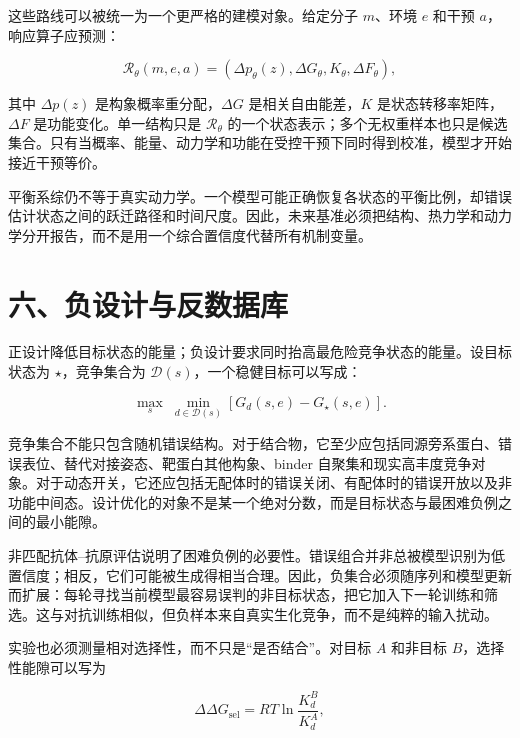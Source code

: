 \documentclass[10pt]{article}
\begin{document}
这些路线可以被统一为一个更严格的建模对象。给定分子 $m$、环境 $e$ 和干预 $a$，响应算子应预测：

\begin{equation}
\mathcal R_\theta(m,e,a)
=
\left(
\Delta p_\theta(z),
\Delta G_\theta,
K_\theta,
\Delta F_\theta
\right),
\label{eq:response}
\end{equation}

其中 $\Delta p(z)$ 是构象概率重分配，$\Delta G$ 是相关自由能差，$K$ 是状态转移率矩阵，$\Delta F$ 是功能变化。单一结构只是 $\mathcal R_\theta$ 的一个状态表示；多个无权重样本也只是候选集合。只有当概率、能量、动力学和功能在受控干预下同时得到校准，模型才开始接近干预等价。

平衡系综仍不等于真实动力学。一个模型可能正确恢复各状态的平衡比例，却错误估计状态之间的跃迁路径和时间尺度。因此，未来基准必须把结构、热力学和动力学分开报告，而不是用一个综合置信度代替所有机制变量。

\section*{六、负设计与反数据库}

正设计降低目标状态的能量；负设计要求同时抬高最危险竞争状态的能量。设目标状态为 $\star$，竞争集合为 $\mathcal D(s)$，一个稳健目标可以写成：

\begin{equation}
\max_s\;
\min_{d\in\mathcal D(s)}
\left[G_d(s,e)-G_\star(s,e)\right].
\label{eq:negative_design}
\end{equation}

竞争集合不能只包含随机错误结构。对于结合物，它至少应包括同源旁系蛋白、错误表位、替代对接姿态、靶蛋白其他构象、binder 自聚集和现实高丰度竞争对象。对于动态开关，它还应包括无配体时的错误关闭、有配体时的错误开放以及非功能中间态。设计优化的对象不是某一个绝对分数，而是目标状态与最困难负例之间的最小能隙。

非匹配抗体--抗原评估说明了困难负例的必要性。错误组合并非总被模型识别为低置信度；相反，它们可能被生成得相当合理\cite{smorodina2026}。因此，负集合必须随序列和模型更新而扩展：每轮寻找当前模型最容易误判的非目标状态，把它加入下一轮训练和筛选。这与对抗训练相似，但负样本来自真实生化竞争，而不是纯粹的输入扰动。

实验也必须测量相对选择性，而不只是“是否结合”。对目标 $A$ 和非目标 $B$，选择性能隙可以写为

\begin{equation}
\Delta\Delta G_{\mathrm{sel}}
=RT\ln\frac{K_d^{B}}{K_d^{A}},
\label{eq:selectivity}
\end{equation}
\end{document}
